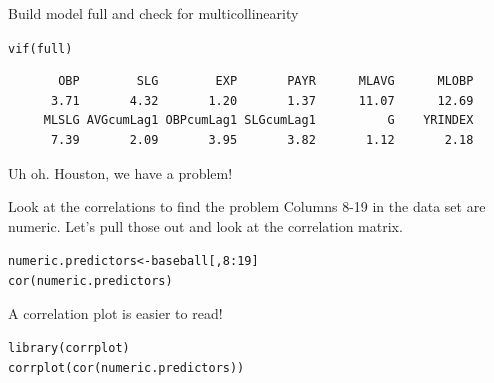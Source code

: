\documentclass{beamer}\usepackage[]{graphicx}\usepackage[]{color}
\makeatletter
\newcommand{\hlnum}[1]{\textcolor[rgb]{0.824,0.412,0.118}{#1}}%
\newcommand{\hlopt}[1]{\textcolor[rgb]{1,0.894,0.769}{#1}}%
\newcommand{\hlstd}[1]{\textcolor[rgb]{1,0.894,0.769}{#1}}%
\newcommand{\hlkwb}[1]{\textcolor[rgb]{0.804,0.776,0.451}{#1}}%
\newcommand{\hlkwd}[1]{\textcolor[rgb]{1,0.78,0.769}{#1}}%
\newenvironment{kframe}{%
 \def\at@end@of@kframe{}%
 \ifinner\ifhmode%
  \def\at@end@of@kframe{\end{minipage}}%
  \begin{minipage}{\columnwidth}%
 \fi\fi%
 \def\FrameCommand##1{\hskip\@totalleftmargin \hskip-\fboxsep
 \colorbox{shadecolor}{##1}\hskip-\fboxsep
     \hskip-\linewidth \hskip-\@totalleftmargin \hskip\columnwidth}%
 \MakeFramed {\advance\hsize-\width
   \@totalleftmargin\z@ \linewidth\hsize
   \@setminipage}}%
 {\par\unskip\endMakeFramed%
 \at@end@of@kframe}
\newenvironment{knitrout}{}{} %
\makeatother
\begin{document}
\begin{darkframes}
\begin{frame}[fragile]{Build model full and check for multicollinearity}
\begin{knitrout}
\begin{kframe}
\begin{alltt}
\hlkwd{vif}\hlstd{(full)}
\end{alltt}
\begin{verbatim}
       OBP        SLG        EXP       PAYR      MLAVG      MLOBP 
      3.71       4.32       1.20       1.37      11.07      12.69 
     MLSLG AVGcumLag1 OBPcumLag1 SLGcumLag1          G    YRINDEX 
      7.39       2.09       3.95       3.82       1.12       2.18 
\end{verbatim}
\end{kframe}
\end{knitrout}
      
      \pause
      \fontsize{10}{10}\selectfont
      Uh oh. Houston, we have a problem!

      \lc %
    \end{frame}


    \begin{frame}[fragile]{Look at the correlations to find the problem}
      Columns 8-19 in the data set are numeric. Let's pull those out and look at the correlation matrix.

\begin{knitrout}
\begin{kframe}
\begin{alltt}
\hlstd{numeric.predictors} \hlkwb{<-} \hlstd{baseball[,}\hlnum{8}\hlopt{:}\hlnum{19}\hlstd{]}
\hlkwd{cor}\hlstd{(numeric.predictors)}
\end{alltt}
\end{kframe}
\end{knitrout}
      
      \lc %
    \end{frame}


    \begin{frame}[fragile]{A correlation plot is easier to read!}
      \fontsize{9}{9}\selectfont 
\begin{knitrout}
\begin{kframe}
\begin{alltt}
\hlkwd{library}\hlstd{(corrplot)}
\hlkwd{corrplot}\hlstd{(}\hlkwd{cor}\hlstd{(numeric.predictors))}
\end{alltt}
\end{kframe}


\end{knitrout}
    \end{frame}


\end{darkframes}
\end{document}
